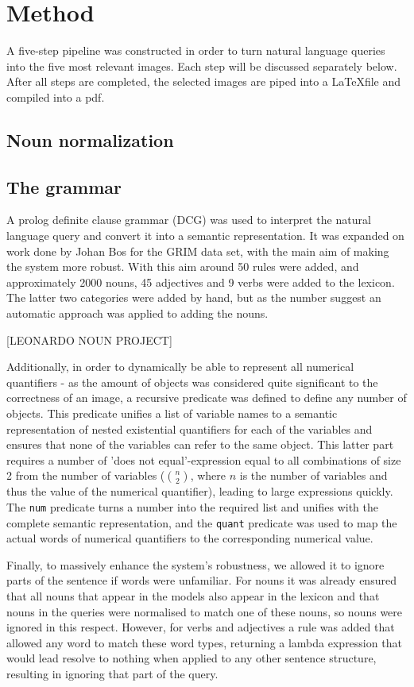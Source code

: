 \section{Method}\label{sec:met}
A five-step pipeline was constructed in order to turn natural language queries into the five most relevant images. Each step will be discussed separately below. After all steps are completed, the selected images are piped into a \LaTeX file and compiled into a pdf.

\subsection{Noun normalization}

\subsection{The grammar}
A prolog definite clause grammar (DCG) was used to interpret the natural language query and convert it into a semantic representation. It was expanded on work done by Johan Bos for the GRIM data set, with the main aim of making the system more robust. With this aim around 50 rules were added, and approximately 2000 nouns, 45 adjectives and 9 verbs were added to the lexicon. The latter two categories were added by hand, but as the number suggest an automatic approach was applied to adding the nouns.

[LEONARDO NOUN PROJECT]

Additionally, in order to dynamically be able to represent all numerical quantifiers - as the amount of objects was considered quite significant to the correctness of an image, a recursive predicate was defined to define any number of objects. This predicate unifies a list of variable names to a semantic representation of nested existential quantifiers for each of the variables and ensures that none of the variables can refer to the same object. This latter part requires a number of 'does not equal'-expression equal to all combinations of size 2 from the number of variables (${{n}\choose{2}}$, where $n$ is the number of variables and thus the value of the numerical quantifier), leading to large expressions quickly. The \texttt{num} predicate turns a number into the required list and unifies with the complete semantic representation, and the \texttt{quant} predicate was used to map the actual words of numerical quantifiers to the corresponding numerical value.

Finally, to massively enhance the system's robustness, we allowed it to ignore parts of the sentence if words were unfamiliar. For nouns it was already ensured that all nouns that appear in the models also appear in the lexicon and that nouns in the queries were normalised to match one of these nouns, so nouns were ignored in this respect. However, for verbs and adjectives a rule was added that allowed any word to match these word types, returning a lambda expression that would lead resolve to nothing when applied to any other sentence structure, resulting in ignoring that part of the query.

